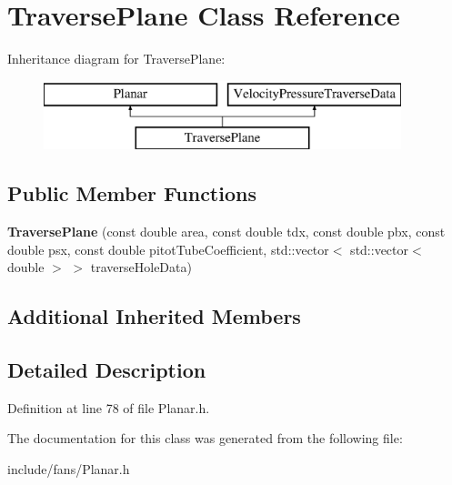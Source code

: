 \hypertarget{class_traverse_plane}{}\section{Traverse\+Plane Class Reference}
\label{class_traverse_plane}
Inheritance diagram for Traverse\+Plane\+:\begin{figure}[H]
\begin{center}
\leavevmode
\includegraphics[height=2.000000cm]{dc/d2a/class_traverse_plane}
\end{center}
\end{figure}
\subsection*{Public Member Functions}
\begin{DoxyCompactItemize}
\item 
\mbox{\label{class_traverse_plane_abbe5d384cc7fbd35c19c4f840247769f}} 
{\bfseries Traverse\+Plane} (const double area, const double tdx, const double pbx, const double psx, const double pitot\+Tube\+Coefficient, std\+::vector$<$ std\+::vector$<$ double $>$ $>$ traverse\+Hole\+Data)
\end{DoxyCompactItemize}
\subsection*{Additional Inherited Members}


\subsection{Detailed Description}


Definition at line 78 of file Planar.\+h.



The documentation for this class was generated from the following file\+:\begin{DoxyCompactItemize}
\item 
include/fans/Planar.\+h\end{DoxyCompactItemize}
